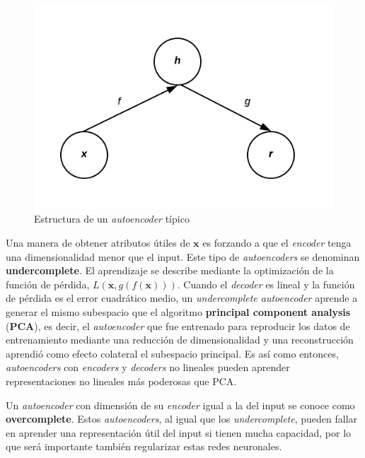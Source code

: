 \begin{figure}[H]
\captionsetup{font=small,labelfont=small}
\caption{Estructura de un \textit{autoencoder} t\'ipico}
\centering
\includegraphics[scale=.8]{img/cap7_autoencoder.png}
\end{figure}

Una manera de obtener atributos \'utiles de $\bm{x}$ es forzando a que el \textit{encoder} tenga una dimensionalidad menor que el input. Este tipo de \textit{autoencoders} se denominan \textbf{undercomplete}. El aprendizaje se describe mediante la optimizaci\'on de la funci\'on de p\'erdida, $L(\bm{x}, g(f(\bm{x})))$. Cuando el \textit{decoder} es lineal y la funci\'on de p\'erdida es el error cuadr\'atico medio, un \textit{undercomplete autoencoder} aprende a generar el mismo subespacio que el algoritmo \textbf{principal component analysis} (\textbf{PCA}), es decir, el \textit{autoencoder} que fue entrenado para reproducir los datos de entrenamiento mediante una reducci\'on de dimensionalidad y una reconstrucci\'on aprendi\'o como efecto colateral el subespacio principal. Es as\'i como entonces, \textit{autoencoders} con \textit{encoders} y \textit{decoders} no lineales pueden aprender representaciones no lineales m\'as poderosas que PCA.

Un \textit{autoencoder} con dimensi\'on de su \textit{encoder} igual a la del input se conoce como \textbf{overcomplete}. Estos \textit{autoencoders}, al igual que los \textit{undercomplete}, pueden fallar en aprender una representaci\'on \'util del input si tienen mucha capacidad, por lo que ser\'a importante tambi\'en regularizar estas redes neuronales.

